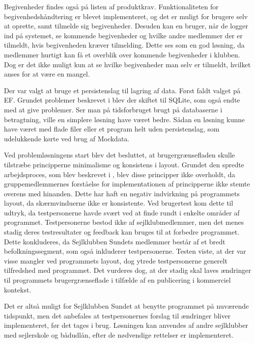 Begivenheder findes også på listen af produktkrav.
Funktionaliteten for begivenhedshåndtering er blevet implementeret, og det er muligt for brugere selv at oprette, samt tilmelde sig begivenheder.
Desuden kan en bruger, når de logger ind på systemet, se kommende begivenheder og hvilke andre medlemmer der er tilmeldt, hvis begivenheden kræver tilmelding. 
Dette ses som en god løsning, da medlemmer hurtigt kan få et overblik over kommende begivenheder i klubben.
Dog er det ikke muligt kun at se hvilke begivenheder man selv er tilmeldt, hvilket anses for at være en mangel. 

Der var valgt at bruge et persistenslag til lagring af data. 
Først faldt valget på \acl{EF}. 
Grundet problemer beskrevet i  blev der skiftet til SQLite, som også endte med at give problemer. 
Ser man på tidsforbruget brugt på databaserne i betragtning, ville en simplere løsning have været bedre.
Sådan en løsning kunne have været med flade filer eller et program helt uden persistenslag, som udelukkende kørte ved brug af Mockdata.  

Ved problemløsningens start blev det besluttet, at brugergrænsefladen skulle tilstræbe principperne minimalisme og konsistens i layout.
Grundet den spredte arbejdsproces, som blev beskrevet i , blev disse principper ikke overholdt, da gruppemedlemmernes forståelse for implementationen af principperne ikke stemte overens med hinanden.
Dette har haft en negativ indvirkning på programmets layout, da skærmvinduerne ikke er konsistente.
Ved brugertest kom dette til udtryk, da testpersonerne havde svært ved at finde rundt i enkelte områder af programmet. 
Testpersonerne bestod ikke af sejlklubmedlemmer, men det menes stadig deres testresultater og feedback kan bruges til at forbedre programmet.
Dette konkluderes, da Sejlklubben Sundets medlemmer består af et bredt befolkningssegment, som også inkluderer testpersonerne.
Testen viste, at der var visse mangler ved programmets layout, dog ytrede testpersonerne generelt tilfredshed med programmet.
Det vurderes dog, at der stadig skal laves ændringer til programmets brugergrænseflade i tilfælde af en publicering i kommerciel kontekst. 

Det er altså muligt for Sejlklubben Sundet at benytte programmet på nuværende tidspunkt, men det anbefales at testpersonernes forslag til ændringer bliver implementeret, før det tages i brug.
Løsningen kan anvendes af andre sejlklubber med sejlerskole og bådudlån, efter de nødvendige rettelser er implementeret. 

